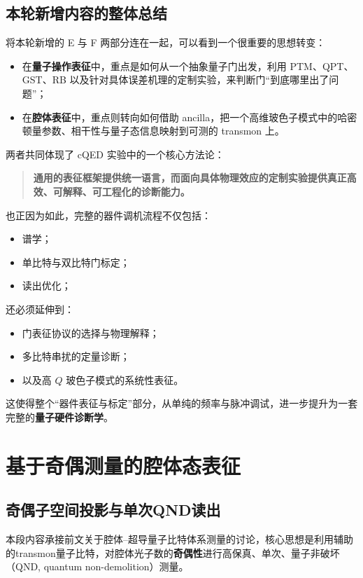 \documentclass[12pt,a4paper,oneside]{ctexbook}
\begin{document}
\subsection{本轮新增内容的整体总结}

将本轮新增的 E 与 F 两部分连在一起，可以看到一个很重要的思想转变：

\begin{itemize}
    \item 在\textbf{量子操作表征}中，重点是如何从一个抽象量子门出发，利用 PTM、QPT、GST、RB 以及针对具体误差机理的定制实验，来判断门“到底哪里出了问题”；
    \item 在\textbf{腔体表征}中，重点则转向如何借助 ancilla，把一个高维玻色子模式中的哈密顿量参数、相干性与量子态信息映射到可测的 transmon 上。
\end{itemize}

两者共同体现了 cQED 实验中的一个核心方法论：
\begin{quote}
\textbf{通用的表征框架提供统一语言，而面向具体物理效应的定制实验提供真正高效、可解释、可工程化的诊断能力。}
\end{quote}

也正因为如此，完整的器件调机流程不仅包括：
\begin{itemize}
    \item 谱学；
    \item 单比特与双比特门标定；
    \item 读出优化；
\end{itemize}
还必须延伸到：
\begin{itemize}
    \item 门表征协议的选择与物理解释；
    \item 多比特串扰的定量诊断；
    \item 以及高 \(Q\) 玻色子模式的系统性表征。
\end{itemize}

这使得整个“器件表征与标定”部分，从单纯的频率与脉冲调试，进一步提升为一套完整的\textbf{量子硬件诊断学}。



\section*{基于奇偶测量的腔体态表征}

\subsection*{奇偶子空间投影与单次QND读出}

本段内容承接前文关于腔体--超导量子比特体系测量的讨论，核心思想是利用辅助的transmon量子比特，对腔体光子数的\textbf{奇偶性}进行高保真、单次、量子非破坏（QND, quantum non-demolition）测量。
\end{document}
